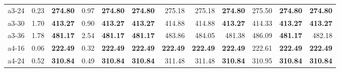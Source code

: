 \documentclass[aspectratio=1610]{beamer}
\begin{document}
\begin{frame}
\begin{table}[]
{\begin{tabular}{lrrrrrrrrrrr}
a3-24                                          & 0.23                                                    & \multicolumn{1}{r|}{\textbf{274.80}} & 0.97                                                         & \textbf{274.80} & \multicolumn{1}{r|}{{\color[HTML]{FE0000} \textbf{274.80}}} & 275.18              & \multicolumn{1}{r|}{275.18}                                    & \textbf{274.80}   & \multicolumn{1}{r|}{275.50}                                  & \textbf{274.80}               & {\color[HTML]{FE0000} \textbf{274.80}}               \\
a3-30                                          & 1.70                                                    & \multicolumn{1}{r|}{\textbf{413.27}} & 0.90                                                         & \textbf{413.27} & \multicolumn{1}{r|}{{\color[HTML]{FE0000} \textbf{413.27}}} & 414.88              & \multicolumn{1}{r|}{414.88}                                    & \textbf{413.27}   & \multicolumn{1}{r|}{414.33}                                  & \textbf{413.27}               & {\color[HTML]{FE0000} \textbf{413.27}}               \\
a3-36                                          & 1.78                                                    & \multicolumn{1}{r|}{\textbf{481.17}} & 2.54                                                         & \textbf{481.17} & \multicolumn{1}{r|}{{\color[HTML]{FE0000} \textbf{481.17}}} & 483.86              & \multicolumn{1}{r|}{484.05}                                    & 481.38            & \multicolumn{1}{r|}{486.09}                                  & \textbf{481.17}               & 482.18                                               \\
a4-16                                          & 0.06                                                    & \multicolumn{1}{r|}{\textbf{222.49}} & 0.32                                                         & \textbf{222.49} & \multicolumn{1}{r|}{{\color[HTML]{FE0000} \textbf{222.49}}} & \textbf{222.49}     & \multicolumn{1}{r|}{{\color[HTML]{FE0000} \textbf{222.49}}}    & \textbf{222.49}   & \multicolumn{1}{r|}{222.61}                                  & \textbf{222.49}               & {\color[HTML]{FE0000} \textbf{222.49}}               \\
a4-24                                          & 0.52                                                    & \multicolumn{1}{r|}{\textbf{310.84}} & 0.49                                                         & \textbf{310.84} & \multicolumn{1}{r|}{{\color[HTML]{FE0000} \textbf{310.84}}} & 311.48              & \multicolumn{1}{r|}{311.48}                                    & \textbf{310.84}   & \multicolumn{1}{r|}{310.95}                                  & \textbf{310.84}               & {\color[HTML]{FE0000} \textbf{310.84}}               \\

\end{tabular}}
\end{table}
\end{frame}
\end{document}
